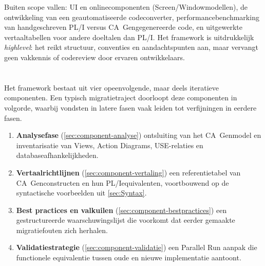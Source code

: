 Buiten scope vallen: UI\- en online\-componenten (Screen/Window\-modellen), de ontwikkeling van een 
geautomatiseerde codeconverter, performance\-benchmarking van handgeschreven PL/I versus 
CA~Gen\-gegenereerde code, en uitgewerkte vertaaltabellen voor andere doeltalen dan PL/I. Het framework 
is uitdrukkelijk \emph{high\-level}: het reikt structuur, conventies en aandachtspunten aan, maar vervangt 
geen vakkennis of code\-review door ervaren ontwikkelaars.

\section{}%
\label{sec:framework-overzicht}

Het framework bestaat uit vier opeenvolgende, maar deels iteratieve componenten. Een typisch 
migratietraject doorloopt deze componenten in volgorde, waarbij vondsten in latere fasen vaak leiden tot 
verfijningen in eerdere fasen.

\begin{enumerate}
    \item \textbf{Analysefase} (\autoref{sec:component-analyse}) ontsluiting van het CA~Gen\-model en 
    inventarisatie van Views, Action Diagrams, USE-relaties en database\-afhankelijkheden.
    \item \textbf{Vertaalrichtlijnen} (\autoref{sec:component-vertaling}) een referentietabel van CA~Gen\-constructen en hun PL/I\-equivalenten, voortbouwend op de syntactische 
    voorbeelden uit \autoref{sec:Syntax}.
    \item \textbf{Best practices en valkuilen} (\autoref{sec:component-bestpractices}) een gestructureerde 
    waarschuwingslijst die voorkomt dat eerder gemaakte migratiefouten zich herhalen.
    \item \textbf{Validatiestrategie} (\autoref{sec:component-validatie}) een Parallel Run aanpak die 
    functionele equivalentie tussen oude en nieuwe implementatie aantoont.
\end{enumerate}

